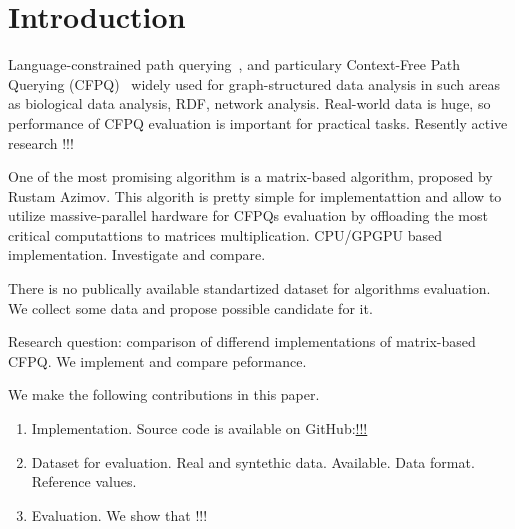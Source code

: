 \section{Introduction}

Language-constrained path querying~\cite{!!!}, and particulary Context-Free Path Querying (CFPQ)~\cite{!!!} widely used for graph-structured data analysis in such areas as biological data analysis, RDF, network analysis.
Real-world data is huge, so performance of CFPQ evaluation is important for practical tasks.
Resently active research !!! ~\cite{!!!}

One of the most promising algorithm is a matrix-based algorithm, proposed by Rustam Azimov.
This algorith is pretty simple for implementattion and allow to utilize massive-parallel hardware for CFPQs evaluation by offloading the most critical computattions to matrices multiplication.
CPU/GPGPU based implementation.
Investigate and compare.

There is no publically available standartized dataset for algorithms evaluation.
We collect some data and propose possible candidate for it. 

Research question: comparison of differend implementations of matrix-based CFPQ.
We implement and compare peformance.

We make the following contributions in this paper.

\begin{enumerate}
\item Implementation. Source code is available on GitHub:\url{!!!}
\item Dataset for evaluation. Real and syntethic data. Available. Data format. Reference values.
\item Evaluation. We show that !!!
\end{enumerate}
